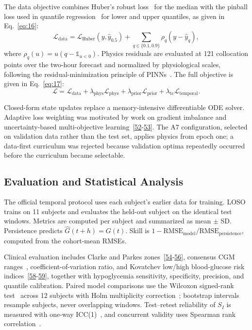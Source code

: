 \documentclass[journal]{IEEEtran}
\begin{document}
The data objective combines Huber's robust loss~\cite{ref39} for the median with the pinball loss used in quantile regression~\cite{ref40} for lower and upper quantiles, as given in Eq.~\eqref{eq:16}:
\begin{equation}
\mathcal{L}_{\text{data}} = \mathcal{L}_{\text{Huber}}(y, \hat{y}_{0.5}) + \sum_{q \in \{0.1, 0.9\}} \rho_q(y - \hat{y}_q),
\label{eq:16}
\end{equation}
where $\rho_q(u) = u(q - \mathbb{1}_{u<0})$. Physics residuals are evaluated at 121 collocation points over the two-hour forecast and normalized by physiological scales, following the residual-minimization principle of PINNs~\cite{ref8}. The full objective is given in Eq.~\eqref{eq:17}:
\begin{equation}
\mathcal{L} = \mathcal{L}_{\text{data}} + \lambda_{\text{phys}} \mathcal{L}_{\text{phys}} + \lambda_{\text{prior}} \mathcal{L}_{\text{prior}} + \lambda_{\text{tc}} \mathcal{L}_{\text{temporal}}.
\label{eq:17}
\end{equation}

Closed-form state updates replace a memory-intensive differentiable ODE solver. Adaptive loss weighting was motivated by work on gradient imbalance and uncertainty-based multi-objective learning~[\hyperref[ref41label]{52}-\hyperref[ref42label]{53}]. The A7 configuration, selected on validation data rather than the test set, applies physics from epoch one; a data-first curriculum was rejected because validation optima repeatedly occurred before the curriculum became selectable.

\subsection{Evaluation and Statistical Analysis}

The official temporal protocol uses each subject's earlier data for training. LOSO trains on 11 subjects and evaluates the held-out subject on the identical test windows. Metrics are computed per subject and summarized as mean $\pm$ SD\@. Persistence predicts $\hat{G}(t+h) = G(t)$. Skill is $1 - \text{RMSE}_{\text{model}}/\text{RMSE}_{\text{persistence}}$, computed from the cohort-mean RMSEs.

Clinical evaluation includes Clarke and Parkes zones~[\hyperref[ref43label]{54}-\hyperref[ref45label]{56}], consensus CGM ranges~\cite{ref52}, coefficient-of-variation ratio, and Kovatchev low/high blood-glucose risk indices~[\hyperref[ref46label]{58}-\hyperref[ref47label]{59}], together with hypoglycemia sensitivity, specificity, precision, and quantile calibration. Paired model comparisons use the Wilcoxon signed-rank test~\cite{ref48} across 12 subjects with Holm multiplicity correction~\cite{ref49}; bootstrap intervals resample subjects, never overlapping windows. Test--retest reliability of $S_I$ is measured with one-way ICC(1)~\cite{ref50}, and concurrent validity uses Spearman rank correlation~\cite{ref51}.
\end{document}
